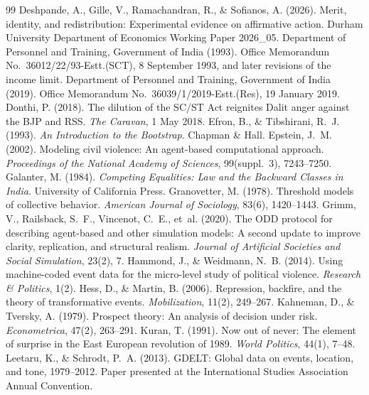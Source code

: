 \documentclass[11pt,a4paper]{article}
\begin{document}
\begin{thebibliography}{99}
 Deshpande, A., Gille, V., Ramachandran, R., \& Sofianos, A. (2026). Merit, identity, and redistribution: Experimental evidence on affirmative action. Durham University Department of Economics Working Paper 2026\_05.
 Department of Personnel and Training, Government of India (1993). Office Memorandum No.\ 36012/22/93-Estt.(SCT), 8 September 1993, and later revisions of the income limit.
 Department of Personnel and Training, Government of India (2019). Office Memorandum No.\ 36039/1/2019-Estt.(Res), 19 January 2019.
 Donthi, P. (2018). The dilution of the SC/ST Act reignites Dalit anger against the BJP and RSS. \emph{The Caravan}, 1 May 2018.
 Efron, B., \& Tibshirani, R.~J. (1993). \emph{An Introduction to the Bootstrap}. Chapman \& Hall.
 Epstein, J.~M. (2002). Modeling civil violence: An agent-based computational approach. \emph{Proceedings of the National Academy of Sciences}, 99(suppl.~3), 7243--7250.
 Galanter, M. (1984). \emph{Competing Equalities: Law and the Backward Classes in India}. University of California Press.
 Granovetter, M. (1978). Threshold models of collective behavior. \emph{American Journal of Sociology}, 83(6), 1420--1443.
 Grimm, V., Railsback, S.~F., Vincenot, C.~E., et~al. (2020). The ODD protocol for describing agent-based and other simulation models: A second update to improve clarity, replication, and structural realism. \emph{Journal of Artificial Societies and Social Simulation}, 23(2), 7.
 Hammond, J., \& Weidmann, N.~B. (2014). Using machine-coded event data for the micro-level study of political violence. \emph{Research \& Politics}, 1(2).
 Hess, D., \& Martin, B. (2006). Repression, backfire, and the theory of transformative events. \emph{Mobilization}, 11(2), 249--267.
 Kahneman, D., \& Tversky, A. (1979). Prospect theory: An analysis of decision under risk. \emph{Econometrica}, 47(2), 263--291.
 Kuran, T. (1991). Now out of never: The element of surprise in the East European revolution of 1989. \emph{World Politics}, 44(1), 7--48.
 Leetaru, K., \& Schrodt, P.~A. (2013). GDELT: Global data on events, location, and tone, 1979--2012. Paper presented at the International Studies Association Annual Convention.

\end{thebibliography}
\end{document}
